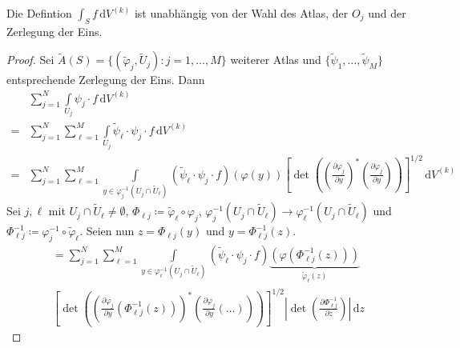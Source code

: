 \documentclass[a4paper,10pt]{scrbook}
\begin{document}
\begin{theorem}[Satz] \label{thm:11.6}
  Die Defintion $\int_S f \, \mathrm{d}V^{(k)}$ ist unabhängig von der Wahl des Atlas, der $O_j$ und der Zerlegung der Eins.

  \begin{proof}
    Sei $\widetilde{A}(S) = \{ (\widetilde{\varphi}_j, \widetilde{U}_j ) : j=1,\ldots,M \}$ weiterer Atlas und $\{ \widetilde{\psi}_1 ,\ldots, \widetilde{\psi}_M \}$ entsprechende Zerlegung der Eins. Dann
    \begin{align*}
      & \sum\limits_{j=1}^{N} \int\limits_{U_j} \psi_j \cdot f \, \mathrm{d}V^{(k)} \\
      =& \sum\limits_{j=1}^{N} \sum\limits_{\ell=1}^{M} \int\limits_{U_j} \widetilde{\psi}_\ell \cdot \psi_j \cdot f \, \mathrm{d}V^{(k)} \\
      =& \sum\limits_{j=1}^{N} \sum\limits_{\ell=1}^{M} \int\limits_{y \in \varphi_j^{-1}(U_j \cap \widetilde{U}_\ell)} \left(\widetilde{\psi}_\ell \cdot \psi_j \cdot f\right) (\varphi(y)) \left[ \det \left( \left( \frac{\partial \varphi_j}{\partial y} \right)^* \left( \frac{\partial \varphi_j}{\partial y} \right) \right) \right]^{1/2} \, \mathrm{d}V^{(k)}
    \end{align*}
    Sei $j,\ell$ mit $U_j \cap \widetilde{U}_\ell \neq \emptyset$, $\Phi_{\ell j} \coloneq \widetilde{\varphi}_\ell \circ \varphi_j$, $\varphi_j^{-1}(U_j \cap \widetilde{U}_\ell) \to \varphi_\ell^{-1}(U_j \cap \widetilde{U}_\ell)$ und $\Phi_{\ell j}^{-1} \coloneq \varphi_j^{-1} \circ \widetilde{\varphi}_\ell$. Seien nun $z = \Phi_{\ell j}(y)$ und $y = \Phi_{\ell j}^{-1}(z)$.
    \begin{multline*}
      = \sum\limits_{j=1}^{N} \sum\limits_{\ell=1}^{M} \int\limits_{y \in \varphi_\ell^{-1}(U_j \cap \widetilde{U}_\ell)}
      \left(\widetilde{\psi}_\ell \cdot \psi_j \cdot f\right)
      \underbrace{(\varphi(\Phi_{\ell j}^{-1}(z)))}_{\widetilde{\varphi}_\ell(z)}
      \\
      \left[ \det \left( \left( \frac{\partial \varphi_j}{\partial y}(\Phi_{\ell j}^{-1}(z)) \right)^* \left( \frac{\partial \varphi_j}{\partial y}(\ldots) \right) \right) \right]^{1/2}
      \left| \det\left( \frac{\partial \Phi_{\ell j}^{-1}}{\partial z} \right) \right|
      \, \mathrm{d}z
    \end{multline*}


\end{proof}
\end{theorem}
\end{document}
